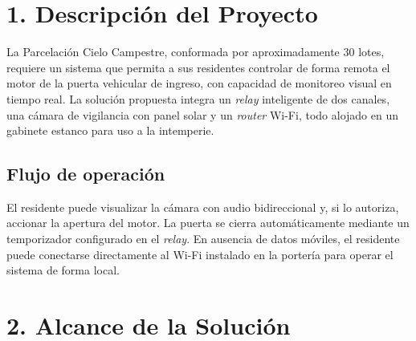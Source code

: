 \documentclass[11pt, a4paper]{article}
\begin{document}
\vspace{0.5cm}

\section{1. Descripción del Proyecto}

La Parcelación Cielo Campestre, conformada por aproximadamente 30 lotes, requiere un sistema que
permita a sus residentes controlar de forma remota el motor de la puerta vehicular de ingreso, con
capacidad de monitoreo visual en tiempo real. La solución propuesta integra un \textit{relay} inteligente
de dos canales, una cámara de vigilancia con panel solar y un \textit{router} Wi-Fi, todo alojado en
un gabinete estanco para uso a la intemperie.

\subsection{Flujo de operación}

El residente puede visualizar la cámara con audio bidireccional y, si lo autoriza, accionar la apertura
del motor. La puerta se cierra automáticamente mediante un temporizador configurado en el \textit{relay}.
En ausencia de datos móviles, el residente puede conectarse directamente al Wi-Fi instalado en la portería
para operar el sistema de forma local.

\needspace{12cm}
\section{2. Alcance de la Solución}
\end{document}
